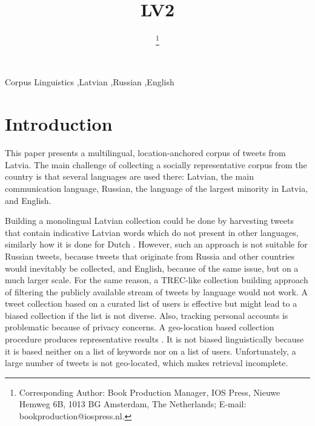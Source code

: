 \documentclass{IOS-Book-Article}
\begin{document}
\begin{frontmatter}              %

\title{LV2}

\author[A]{ %
\thanks{Corresponding Author: Book Production Manager, IOS Press, Nieuwe Hemweg 6B,
1013 BG Amsterdam, The Netherlands; E-mail:
bookproduction@iospress.nl.}}


\address[A]{Confidential Review Copy, Do Not Distribute}

%

\begin{keyword}
Corpus Linguistics \sep Latvian \sep Russian \sep English
\end{keyword}
\end{frontmatter}

\thispagestyle{empty}
\pagestyle{empty}

\section*{Introduction}

This paper presents a multilingual, location-anchored corpus of tweets from Latvia. The main challenge of collecting a socially representative corpus from the country is that several languages are used there: Latvian, the main communication language, Russian, the language of the largest minority in Latvia, and English.

%
Building a monolingual Latvian collection could be done by harvesting tweets that contain indicative Latvian words which do not present in other languages, similarly how it is done for Dutch \cite{sang2013}. However, such an approach is not suitable for Russian tweets, because tweets that originate from Russia and other countries would inevitably be collected, and English, because of the same issue, but on a much larger scale.
%
For the same reason, a TREC-like collection building approach \cite{lin2016overview} of filtering the publicly available stream of tweets by language would not work.
%
A tweet collection based on a curated list of users \cite{SANVICENTE16.465} is effective but might lead to a biased collection if the list is not diverse. Also, tracking personal accounts is problematic because of privacy concerns.
%
A geo-location based collection procedure produces representative results \cite{milajevs:2017:BUCC}. It is not biased linguistically because it is based neither on a list of keywords nor on a list of users. Unfortunately, a large number of tweets is not geo-located, which makes retrieval incomplete.
\end{document}
